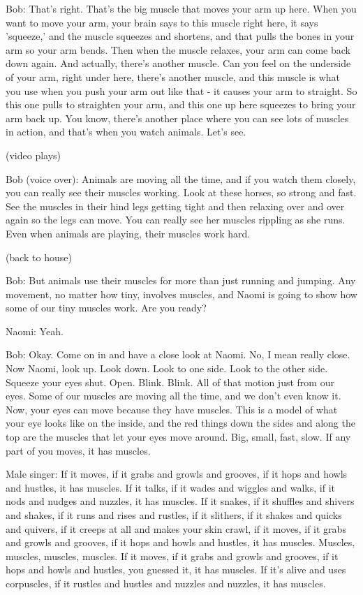 Bob: That's right. That's the big muscle that moves your arm up here. When you want to move your arm, your brain says to this muscle right here, it says 'squeeze,' and the muscle squeezes and shortens, and that pulls the bones in your arm so your arm bends. Then when the muscle relaxes, your arm can come back down again. And actually, there's another muscle. Can you feel on the underside of your arm, right under here, there's another muscle, and this muscle is what you use when you push your arm out like that - it causes your arm to straight. So this one pulls to straighten your arm, and this one up here squeezes to bring your arm back up. You know, there's another place where you can see lots of muscles in action, and that's when you watch animals. Let's see.

(video plays)

Bob (voice over): Animals are moving all the time, and if you watch them closely, you can really see their muscles working. Look at these horses, so strong and fast. See the muscles in their hind legs getting tight and then relaxing over and over again so the legs can move. You can really see her muscles rippling as she runs. Even when animals are playing, their muscles work hard.

(back to house)

Bob: But animals use their muscles for more than just running and jumping. Any movement, no matter how tiny, involves muscles, and Naomi is going to show how some of our tiny muscles work. Are you ready?

Naomi: Yeah.

Bob: Okay. Come on in and have a close look at Naomi. No, I mean really close. Now Naomi, look up. Look down. Look to one side. Look to the other side. Squeeze your eyes shut. Open. Blink. Blink. All of that motion just from our eyes. Some of our muscles are moving all the time, and we don't even know it. Now, your eyes can move because they have muscles. This is a model of what your eye looks like on the inside, and the red things down the sides and along the top are the muscles that let your eyes move around. Big, small, fast, slow. If any part of you moves, it has muscles.

Male singer: If it moves, if it grabs and growls and grooves, if it hops and howls and hustles, it has muscles. If it talks, if it wades and wiggles and walks, if it nods and nudges and nuzzles, it has muscles. If it snakes, if it shuffles and shivers and shakes, if it runs and rises and rustles, if it slithers, if it shakes and quicks and quivers, if it creeps at all and makes your skin crawl, if it moves, if it grabs and growls and grooves, if it hops and howls and hustles, it has muscles. Muscles, muscles, muscles, muscles. If it moves, if it grabs and growls and grooves, if it hops and howls and hustles, you guessed it, it has muscles. If it's alive and uses corpuscles, if it rustles and hustles and nuzzles and nuzzles, it has muscles.

